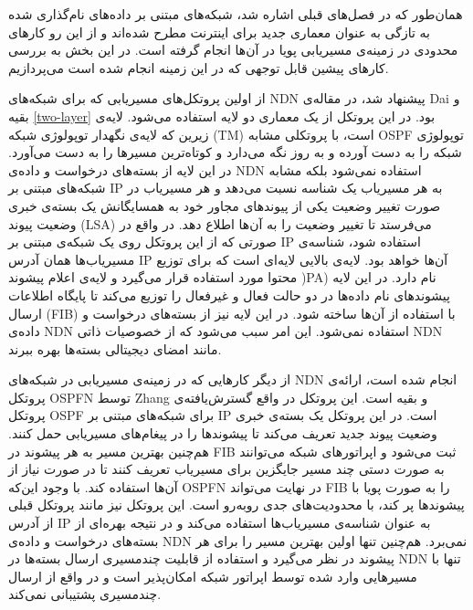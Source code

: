 

همان‌طور که در فصل‌های قبلی اشاره شد، شبکه‌های مبتنی بر داده‌‌های نام‌گذاری شده به تازگی به عنوان معماری جدید برای اینترنت مطرح شده‌اند و از این رو کارهای محدودی در زمینه‌ی مسیریابی پویا در آن‌ها انجام گرفته است. در این بخش به بررسی کارهای پیشین قابل توجهی که در این زمینه انجام شده است می‌پردازیم.

از اولین پروتکل‌های مسیریابی که برای شبکه‌های NDN پیشنهاد شد، در مقاله‌ی Dai و بقیه \ref{two-layer} بود. در این پروتکل از یک معماری دو لایه استفاده می‌شود. لایه‌ی زیرین که لایه‌ی نگهدار توپولوژی شبکه  (TM) است، با پروتکلی مشابه OSPF توپولوژی شبکه را به دست آورده و به روز نگه می‌دارد و کوتاه‌ترین مسیرها را به دست می‌آورد. در این لایه از بسته‌های درخواست و داده‌ی NDN استفاده نمی‌شود بلکه مشابه شبکه‌های مبتنی بر IP به هر مسیریاب یک شناسه نسبت می‌دهد و هر مسیریاب در صورت تغییر وضعیت یکی از پیوند‌‌های مجاور خود به همسایگانش یک بسته‌ی خبری وضعیت پیوند  (LSA) می‌فرستد تا تغییر وضعیت را به آن‌ها اطلاع دهد. در واقع در صورتی که از این پروتکل روی یک شبکه‌ی مبتنی بر IP استفاده شود، شناسه‌ی مسیریاب‌ها همان آدرس IP آن‌ها خواهد بود. لایه‌ی بالایی لایه‌ای است که برای توزیع محتوا مورد استفاده قرار می‌گیرد و لایه‌ی اعلام پیشوند   )PA) نام دارد. در این لایه پیشوند‌های نام داده‌ها در دو حالت فعال و غیرفعال را توزیع می‌کند تا پایگاه اطلاعات ارسال (FIB) با استفاده از آن‌ها ساخته شود. در این لایه نیز از بسته‌های درخواست و داده‌ی NDN استفاده نمی‌شود. این امر سبب می‌شود که از خصوصیات ذاتی NDN مانند امضای دیجیتالی بسته‌ها بهره ببرند.

از دیگر کارهایی که در زمینه‌ی مسیریابی در شبکه‌های NDN انجام شده است، ارائه‌ی پروتکل OSPFN توسط Zhang و بقیه \cite{ospfn} است. این پروتکل در واقع گسترش‌یافته‌ی پروتکل OSPF برای شبکه‌های مبتنی بر IP است. در این پروتکل یک بسته‌ی خبری وضعیت پیوند جدید تعریف می‌کند تا پیشوند‌ها را در پیغام‌های مسیریابی حمل کنند. هم‌چنین بهترین مسیر به هر پیشوند در FIB ثبت می‌شود و اپراتورهای شبکه می‌توانند به صورت دستی چند مسیر جایگزین برای مسیریاب تعریف کنند تا در صورت نیاز از آن‌ها استفاده کند. با وجود این‌که OSPFN در نهایت می‌تواند FIB را به صورت پویا با پیشوندها پر کند، با محدودیت‌های جدی روبه‌رو است. این پروتکل نیز مانند پروتکل قبلی از آدرس IP به عنوان شناسه‌ی مسیریاب‌ها استفاده می‌کند و در نتیجه بهره‌ای از بسته‌های درخواست و داده‌ی NDN نمی‌برد. هم‌چنین تنها اولین بهترین مسیر را برای هر پیشوند در نظر می‌گیرد و استفاده از قابلیت چندمسیری ارسال بسته‌ها در NDN تنها با مسیرهایی وارد شده توسط اپراتور شبکه امکان‌پذیر است و در واقع از ارسال چندمسیری پشتیبانی نمی‌کند.

